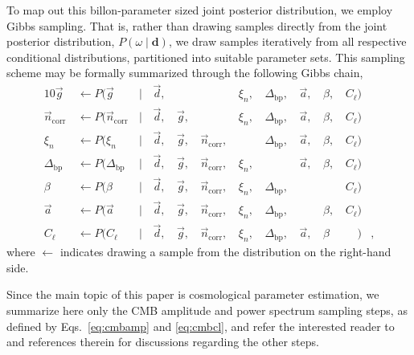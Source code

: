 \documentclass[onecolumn]{aa}
\renewcommand{\d}[0]{\vec{d}}
\newcommand{\n}[0]{\vec{n}}
\renewcommand{\a}[0]{\vec{a}}
\newcommand{\g}[0]{\vec{g}}
\newcommand{\Dbp}[0]{\Delta_{\mathrm{bp}}}
\begin{document}
To map out this billon-parameter sized joint posterior distribution,
we employ Gibbs sampling. That is, rather than drawing samples
directly from the joint posterior distribution, $P(\omega
\mid\mathbf{d})$, we draw samples iteratively from all respective
conditional distributions, partitioned into suitable parameter sets. This sampling scheme may be formally
summarized through the following Gibbs chain,
\begin{alignat}{10}
\g &\,\leftarrow P(\g&\,\mid &\,\d,&\, & &\,\xi_n, &\,\Dbp, &\,\a, &\,\beta, &\,C_{\ell})\\
\n_{\mathrm{corr}} &\,\leftarrow P(\n_{\mathrm{corr}}&\,\mid &\,\d, &\,\g, &\,&\,\xi_n,
&\,\Dbp, &\,\a, &\,\beta, &\,C_{\ell})\\
\xi_n &\,\leftarrow P(\xi_n&\,\mid &\,\d, &\,\g, &\,\n_{\mathrm{corr}}, &\,
&\,\Dbp, &\,\a, &\,\beta, &\,C_{\ell})\\
\Dbp &\,\leftarrow P(\Dbp&\,\mid &\,\d, &\,\g, &\,\n_{\mathrm{corr}}, &\,\xi_n,
&\,&\,\a, &\,\beta, &\,C_{\ell})\\
\beta &\,\leftarrow P(\beta&\,\mid &\,\d, &\,\g, &\,\n_{\mathrm{corr}}, &\,\xi_n,
&\,\Dbp, & &\,&\,C_{\ell})\\\label{eq:cmbamp}
\a &\,\leftarrow P(\a&\,\mid &\,\d, &\,\g, &\,\n_{\mathrm{corr}}, &\,\xi_n,
&\,\Dbp, &\,&\,\beta, &\,C_{\ell})\\\label{eq:cmbcl}
C_{\ell} &\,\leftarrow P(C_{\ell}&\,\mid &\,\d, &\,\g, &\,\n_{\mathrm{corr}}, &\,\xi_n,
&\,\Dbp, &\,\a, &\,\beta&\,\phantom{C_{\ell}})&,
\end{alignat}
where $\leftarrow$ indicates drawing a sample from the distribution on
the right-hand side.

Since the main topic of this paper is cosmological parameter
estimation, we summarize here only the CMB amplitude and power
spectrum sampling steps, as defined by Eqs.~\eqref{eq:cmbamp} and
\eqref{eq:cmbcl}, and refer the interested reader to \citet{bp01} and
references therein for discussions regarding the other steps.
\end{document}

